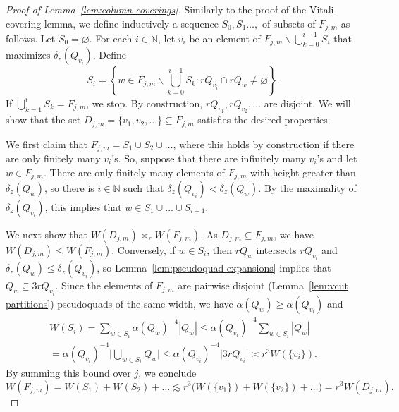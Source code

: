 \documentclass[11pt,reqno]{amsart}
\newcommand{\N}{\mathbb{N}}
\renewcommand{\approx}{\asymp}
\newcommand{\0}{\mathbf{0}}
\renewcommand{\1}{\mathbf 1}
\renewcommand{\mid}{:}
\renewcommand{\subset}{\subseteq}
\renewcommand{\ge}{\geqslant}
\renewcommand{\le}{\leqslant}
\renewcommand{\setminus}{\smallsetminus}
\renewcommand{\emptyset}{\varnothing}
\theoremstyle{remark}
\begin{document}
\begin{proof}[{Proof of Lemma~\ref{lem:column coverings}}] Similarly to the proof of the Vitali covering lemma, we define inductively a sequence $S_0,S_1\ldots,$ of subsets of $F_{j,m}$ as follows.
  Let $S_0=\emptyset$.  For each $i\in \N$, let $v_i$ be an element of $F_{j,m}\setminus \bigcup_{k=0}^{i-1}S_i$ that maximizes $\delta_z(Q_{v_i})$.  Define
  $$S_{i}=\left\{w\in F_{j,m}\setminus \bigcup_{k=0}^{i-1}S_k\mid rQ_{v_i}\cap rQ_w\ne \emptyset\right\}.$$
  If $\bigcup_{k=1}^{i}S_k=F_{j,m}$,  we stop.  By construction, $rQ_{v_1},rQ_{v_2},\ldots$ are disjoint.  We will show that the set  $D_{j,m}=\{v_1,v_2,\ldots\}\subset F_{j,m}$ satisfies the desired properties.

  We first claim that $F_{j,m}=S_1\cup S_2\cup\ldots$, where this holds by construction if  there are only finitely many $v_i$'s. So,  suppose that there are infinitely many $v_i$'s and let $w\in F_{j,m}$.  There are only finitely many elements of $F_{j,m}$ with height greater than $\delta_z(Q_w)$, so there is  $i\in \N$ such that $\delta_z(Q_{v_i})<\delta_z(Q_w)$.  By the maximality of $\delta_z(Q_{v_i})$, this implies that $w\in S_1\cup\ldots\cup S_{i-1}.$

  We next show that $W(D_{j,m})\approx_r W(F_{j,m})$.  As $D_{j,m}\subset F_{j,m}$, we have  $W(D_{j,m})\le W(F_{j,m})$.  Conversely, if $w\in S_i$, then $rQ_w$ intersects $rQ_{v_i}$ and $\delta_z(Q_{w})\le \delta_z(Q_{v_i})$, so Lemma~\ref{lem:pseudoquad expansions} implies that $Q_w\subset 3rQ_{v_i}$.  Since the elements of $F_{j,m}$ are pairwise disjoint (Lemma~\ref{lem:vcut partitions}) pseudoquads of the same width, we have $\alpha(Q_{w})\ge \alpha(Q_{v_i})$ and
  \begin{multline*}
  W(S_i)=\sum_{w\in S_i} \alpha(Q_w)^{-4}|Q_w| \le \alpha(Q_{v_i})^{-4}  \sum_{w\in S_i} |Q_w|\\= \alpha(Q_{v_i})^{-4} \Big|\bigcup_{w\in S_i} Q_w\Big|  \le \alpha(Q_{v_i})^{-4}\bigl|3rQ_{v_i}\bigr| \approx r^3W(\{v_i\}).
  \end{multline*}
By summing this bound over $j$, we conclude
 \begin{equation*}W(F_{j,m})=W(S_1)+W(S_2)+\ldots \lesssim r^3 \bigl(W(\{v_1\})+W(\{v_2\})+\ldots\bigl) =r^3 W(D_{j,m}).\tag*{\qedhere}\end{equation*}
\end{proof}
\end{document}
